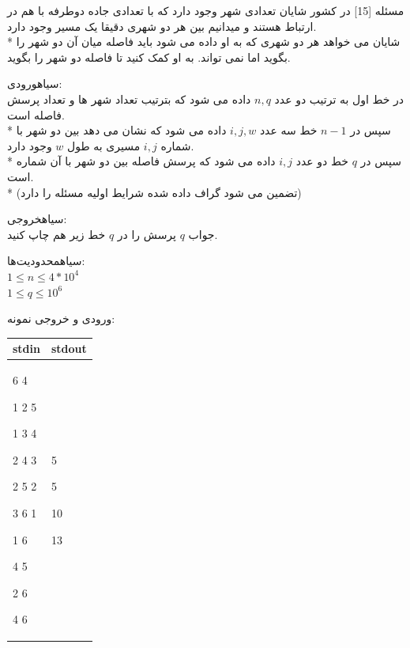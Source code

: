 
‌مسئله [15]
در کشور شایان تعدادی شهر وجود دارد که با تعدادی جاده دوطرفه با هم در ارتباط هستند و میدانیم بین هر دو شهری دقیقا یک مسیر وجود دارد.\\*
شایان می خواهد هر دو شهری که  به او داده می شود باید فاصله میان آن دو شهر را بگوید اما نمی تواند.
به او کمک کنید تا فاصله دو شهر را بگوید.

‌سیاه{ورودی:}\\
در خط اول به ترتیب دو عدد  $n,q$ داده می شود که بترتیب تعداد شهر ها و تعداد پرسش فاصله است.\\*
سپس در $n-1$ خط سه عدد $i,j,w$ داده می شود که نشان می دهد بین دو شهر با شماره $i,j$ مسیری به طول $w$ وجود دارد.\\*
سپس در $q$ خط دو عدد $i,j$ داده می شود که پرسش فاصله بین دو شهر با آن شماره است.\\*
(تضمین می شود گراف داده شده شرایط اولیه مسئله را دارد)

‌سیاه{خروجی:}\\
جواب $q$ پرسش را در $q$ خط زیر هم چاپ کنید.

‌سیاه{محدودیت‌ها:}\\
$1 \leq n \leq 4 * 10^4$ \\
$1 \leq q \leq 10^6$

ورودی و خروجی نمونه:

\begin{latin}
	\begin{tabularx}{\textwidth}{|X | X|}
		\hline
		\textbf{stdin} &
		\textbf{stdout}\\
		\hline
		6 4
		
		1 2 5
		
		1 3 4
		
		2 4 3
		
		2 5 2
		
		3 6 1
		
		1 6
		
		4 5
		
		2 6
		
		4 6&
		
		5 
		
		5 
		
		10 
		
		13\\
		\hline
		
	\end{tabularx}
\end{latin}



